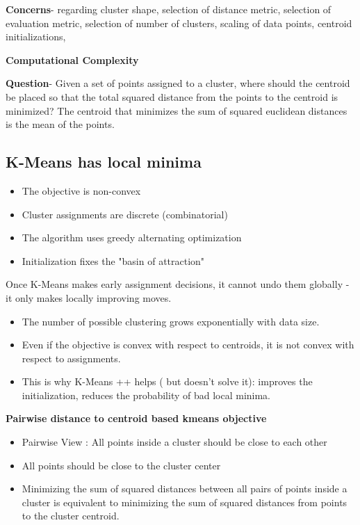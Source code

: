 \documentclass[10pt,a4paper]{article}
\begin{document}
	\textbf{Concerns}- regarding cluster shape, selection of distance metric, selection of evaluation metric, selection of number of clusters, scaling of data points, centroid initializations,

	\textbf{Computational Complexity}

	\textbf{Question}- Given a set of points assigned to a cluster, where should the centroid be placed so that the total squared distance from the points to the centroid is minimized? The centroid that minimizes the sum of squared euclidean distances is the mean of the points.

	\subsection{K-Means has local minima}

	\begin{itemize}
		\item The objective is non-convex
		\item Cluster assignments are discrete (combinatorial)
		\item The algorithm uses greedy alternating optimization
		\item Initialization fixes the "basin of attraction"
	\end{itemize}

	Once K-Means makes early assignment decisions, it cannot undo them globally - it only makes locally improving moves.

	\begin{itemize}
		\item The number of possible clustering grows exponentially with data size.
		\item Even if the objective is convex with respect to centroids, it is not convex with respect to assignments.
		\item This is why K-Means ++ helps ( but doesn't solve it): improves the initialization, reduces the probability of bad local minima.
	\end{itemize}

	\textbf{Pairwise distance to centroid based kmeans objective}

	\begin{itemize}
		\item Pairwise View : All points inside a cluster should be close to each other
		\item All points should be close to the cluster center
		\item Minimizing the sum of squared distances between all pairs of points inside a cluster is equivalent to minimizing the sum of squared distances from points to the cluster centroid.
	\end{itemize}
\end{document}
